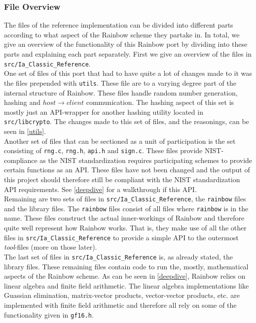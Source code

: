 \subsubsection{File Overview}
The files of the reference implementation can be divided into different parts according to what aspect of the Rainbow scheme they partake in. In total, we give an overview of the functionality of this Rainbow port by dividing into these parts and explaining each part separately. First we give an overview of the files in \texttt{src/Ia\_Classic\_Reference}.
\medskip\\
One set of files of this port that had to have quite a lot of changes made to it was the files prepended with \texttt{utils}. These file are to a varying degree part of the internal structure of Rainbow. These files handle random number generation, hashing and $host\rightarrow client$ communication. The hashing aspect of this set is mostly just an API-wrapper for another hashing utility located in \texttt{src/libcrypto}. The changes made to this set of files, and the reasonings, can be seen in \cref{utils}.
\medskip\\
Another set of files that can be sectioned as a unit of participation is the set consisting of \texttt{rng.c}, \texttt{rng.h}, \texttt{api.h} and \texttt{sign.c}. These files provide NIST-compliance as the NIST standardization requires participating schemes to provide certain functions as an API. \cite{nistapi} These files have not been changed and the output of this project should therefore still be compliant with the NIST standardization API requirements. See \cref{deepdive} for a walkthrough if this API.
\medskip\\
Remaining are two sets of files in \texttt{src/Ia\_Classic\_Reference}, the \texttt{rainbow} files and the library files. The \texttt{rainbow} files consist of all files where \texttt{rainbow} is in the name. These files construct the actual inner-workings of Rainbow and therefore quite well represent how Rainbow works. That is, they make use of all the other files in \texttt{src/Ia\_Classic\_Reference} to provide a simple API to the outermost \emph{tool}-files (more on those later).
\medskip\\
The last set of files in \texttt{src/Ia\_Classic\_Reference} is, as already stated, the library files. These remaining files contain code to run the, mostly, mathematical aspects of the Rainbow scheme. As can be seen in \cref{deepdive}, Rainbow relies on linear algebra and finite field arithmetic. The linear algebra implementations like Guassian elimination, matrix-vector products, vector-vector products, etc. are implemented with finite field arithmetic and therefore all rely on some of the functionality given in \texttt{gf16.h}.
